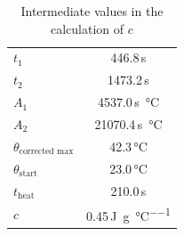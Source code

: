 \documentclass[a4paper,11pt]{article}
\begin{document}
\begin{table}[h]
\begin{center}
\begin{tabular}{lS[table-format=1.7,table-align-text-post = false]}
$t_1$ & 446.8\,\si{s} \\
$t_2$ & 1473.2\,\si{s} \\
$A_1$ & 4537.0\,\si{\second\celsius} \\
$A_2$ & 21070.4\,\si{\second\celsius} \\
$\theta_{\text{corrected max}}$ & 42.3\,\si{\celsius} \\
$\theta_{\text{start}}$ & 23.0\,\si{\celsius} \\
$t_{\text{heat}}$ & 210.0\,\si{s} \\
$c$ & 0.45\,\si{\joule\per\gram\per\celsius} \\
\end{tabular}
\end{center}
\caption{Intermediate values in the calculation of $c$}\label{tab:values}
\end{table}

\nocite{*}


\end{document}
